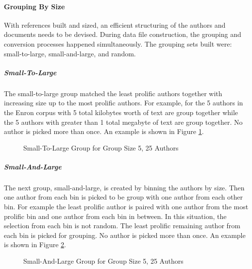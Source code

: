 	\paragraph{Grouping By Size} With references built and sized, an efficient structuring of the authors and documents needs to be devised.  During data file construction, the grouping and conversion processes happened simultaneously.  The grouping sets built were: small-to-large, small-and-large, and random.  
		\subparagraph{Small-To-Large} The small-to-large group matched the least prolific authors together with increasing size up to the most prolific authors.  For example, for the 5 authors in the Enron corpus with 5 total kilobytes worth of text are group together while the 5 authors with greater than 1 total megabyte of text are group together.  No author is picked more than once.  An example is shown in Figure \ref{fig:smallToLargeGrouping}.
		\begin{figure}[ht!]
			\begin{center}
				\caption{Small-To-Large Group for Group Size 5, 25 Authors}
				\label{fig:smallToLargeGrouping}
			\end{center}
		\end{figure}
		\subparagraph{Small-And-Large} The next group, small-and-large, is created by binning the authors by size.  Then one author from each bin is picked to be group with one author from each other bin.  For example the least prolific author is paired with one author from the most prolific bin and one author from each bin in between.  In this situation, the selection from each bin is not random.  The least prolific remaining author from each bin is picked for grouping.  No author is picked more than once. An example is shown in Figure \ref{fig:smallAndLargeGrouping}.
		\begin{figure}[ht!]
			\begin{center}
				\caption{Small-And-Large Group for Group Size 5, 25 Authors}
				\label{fig:smallAndLargeGrouping}
			\end{center}
		\end{figure}
